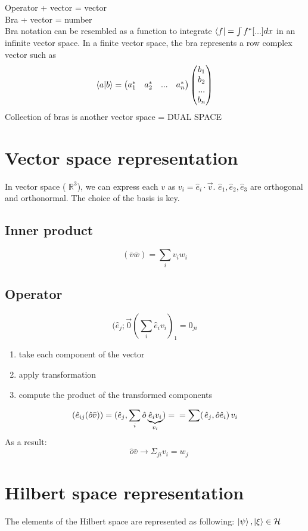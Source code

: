 Operator + vector = vector\\
Bra + vector = number\\
Bra notation can be resembled as a function to integrate $\bra{f}=\int f^*[...]dx$ in an infinite vector space. In a finite vector space, the bra represents a row complex vector such as
\[
\braket{a}{b}=\begin{pmatrix}a^*_1&a^*_2&...&a^*_n\end{pmatrix}\begin{pmatrix}b_1\\b_2\\...\\b_n\end{pmatrix}
\]
Collection of bras is another vector space = DUAL SPACE\\
\section{Vector space representation}
In vector space ( $\mathbb{R}^3$), we can express each $v$ as $v_i=\hat{e}_i \cdot \vec{v}$. $\hat{e}_1,\hat{e}_2,\hat{e}_3$ are orthogonal and orthonormal. The choice of the basis is key.
\subsection{Inner product}
$$(\bar{v}\bar{w})=\sum_{i} v_i w_i$$
\subsection{Operator}
$$(\hat{e}_{j} ; \vec{0}(\sum_{i} \hat{e}_{i} v_{i})_{1}=0_{j i}$$
\begin{enumerate}
\item take each component of the vector
\item apply transformation
\item compute the product of the transformed components
\end{enumerate}

$$
\left(\hat{e}_{i j}(\hat{o} \bar{v})\right)=(\hat{e}_{j}, \sum_{i} \hat{o} \underbrace{\hat{e}_{i} v_{i}}_{v_{i}})= \\
=\sum({\left.\hat{e}_{j}, \hat{o} \hat{e}_{i}\right) v_{i}}$$
As a result: $$ \quad \hat{o} \bar{v} \rightarrow \Sigma_{j i} v_{i}=w_{j}$$

\section{Hilbert space representation}
The elements of the Hilbert space are represented as following: $\ket{\psi},\ket{\xi} \in \mathcal{H}$
